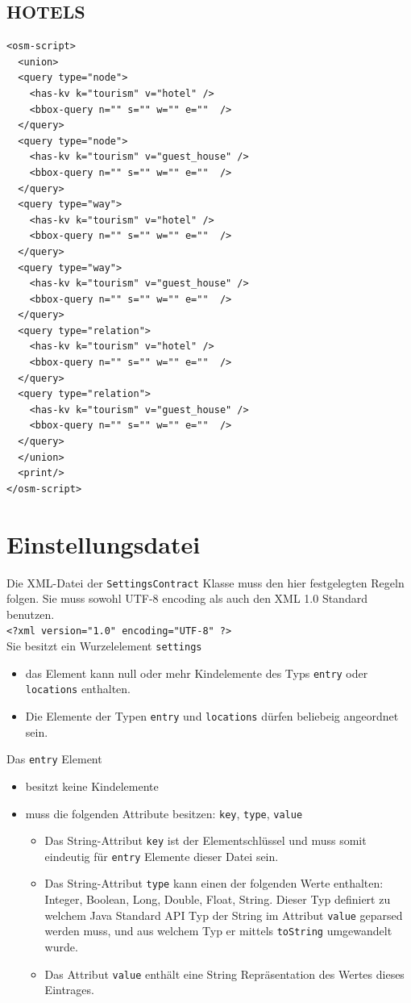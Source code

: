 \documentclass[10pt]{scrreprt}
\begin{document}
\subsection*{HOTELS}
\begin{lstlisting}
<osm-script>
  <union>
  <query type="node">
    <has-kv k="tourism" v="hotel" />
    <bbox-query n="" s="" w="" e=""  />
  </query>
  <query type="node">
    <has-kv k="tourism" v="guest_house" />
    <bbox-query n="" s="" w="" e=""  />
  </query>
  <query type="way">
    <has-kv k="tourism" v="hotel" />
    <bbox-query n="" s="" w="" e=""  />
  </query>
  <query type="way">
    <has-kv k="tourism" v="guest_house" />
    <bbox-query n="" s="" w="" e=""  />
  </query>
  <query type="relation">
    <has-kv k="tourism" v="hotel" />
    <bbox-query n="" s="" w="" e=""  />
  </query>
  <query type="relation">
    <has-kv k="tourism" v="guest_house" />
    <bbox-query n="" s="" w="" e=""  />
  </query>
  </union>
  <print/>
</osm-script>
\end{lstlisting}

\newpage

\section{Einstellungsdatei}
Die XML-Datei der \texttt{SettingsContract} Klasse muss den hier festgelegten Regeln folgen.
Sie muss sowohl UTF-8 encoding als auch den XML 1.0 Standard benutzen. \\
\texttt{<?xml version="{}1.0"{} encoding="{}UTF-8"{} ?>} \\
Sie besitzt ein Wurzelelement \texttt{settings}
\begin{itemize}
 \item das Element kann null oder mehr Kindelemente des Typs \texttt{entry} oder \texttt{locations} enthalten.
 \item Die Elemente der Typen \texttt{entry} und \texttt{locations} dürfen beliebeig angeordnet sein.
\end{itemize}

Das \texttt{entry} Element
\begin{itemize}
 \item besitzt keine Kindelemente
 \item muss die folgenden Attribute besitzen: \texttt{key}, \texttt{type}, \texttt{value}
 \begin{itemize}
 \item Das String-Attribut \texttt{key} ist der Elementschlüssel und muss somit eindeutig für \texttt{entry} Elemente dieser Datei sein.
 \item Das String-Attribut \texttt{type} kann einen der folgenden Werte enthalten: Integer, Boolean, Long, Double, Float, String.
  Dieser Typ definiert zu welchem Java Standard API Typ der String im Attribut \texttt{value} geparsed werden muss, und aus welchem Typ er mittels \texttt{toString} umgewandelt wurde.
   \item Das Attribut \texttt{value} enthält eine String Repräsentation des Wertes dieses Eintrages.
 \end{itemize}
\end{itemize}
\end{document}

